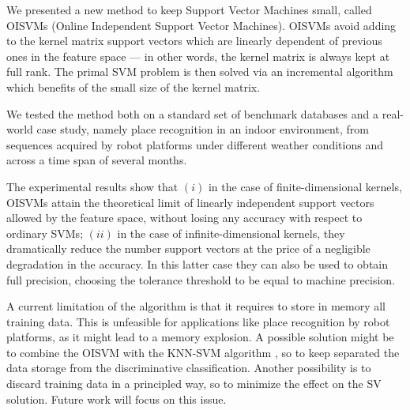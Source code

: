 We presented a new method to keep Support Vector Machines small,
called OISVMs (Online Independent Support Vector Machines). OISVMs
avoid adding to the kernel matrix support vectors which are linearly
dependent of previous ones in the feature space --- in other words,
the kernel matrix is always kept at full rank. The primal SVM problem
is then solved via an incremental algorithm which benefits of the
small size of the kernel matrix.

We tested the method both on a standard set of benchmark
databases and a real-world case study, namely place recognition in an
indoor environment, from sequences acquired by robot platforms under
different weather conditions and across a time span of several months.

The experimental results show that $(i)$ in the case of
finite-dimensional kernels, OISVMs attain the theoretical limit of
linearly independent support vectors allowed by the feature space,
without losing any accuracy  with respect to ordinary SVMs;
$(ii)$ in the case of infinite-dimensional kernels, they dramatically
reduce the number support vectors at the price of a negligible
degradation in the accuracy. In this latter case they can also be used
to obtain full precision, choosing the tolerance threshold to be equal
to machine precision.

A current limitation of the algorithm is that it requires to store in memory 
all training data. This is unfeasible for applications like place recognition 
by robot platforms, as it might lead to a memory explosion. A possible 
solution might be to combine the OISVM with the KNN-SVM algorithm 
\cite{zhang:cvpr06}, so 
to keep separated
the data storage from the discriminative classification. Another possibility 
is to discard training data in a principled way, so to minimize the effect 
on the SV solution. Future work will focus on this issue.
